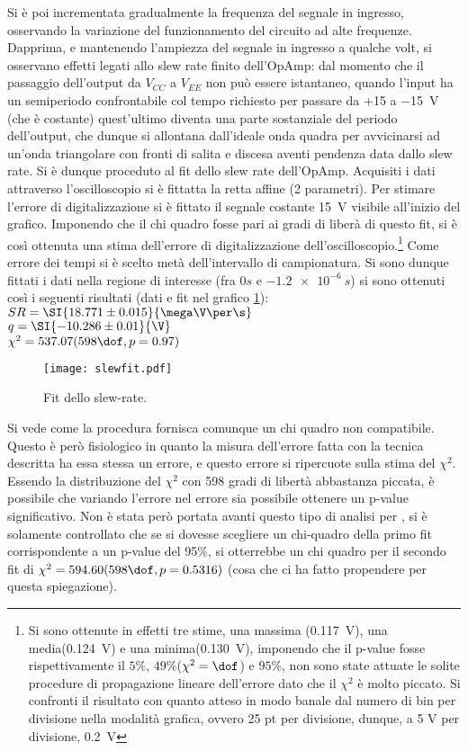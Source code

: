 Si è poi incrementata gradualmente la frequenza del segnale in ingresso, osservando la variazione del funzionamento del circuito ad alte frequenze.
Dapprima, e mantenendo l'ampiezza del segnale in ingresso a qualche volt, si osservano effetti legati allo slew rate finito dell'OpAmp: dal momento che il passaggio dell'output da $V_{CC}$ a $V_{EE}$ non può essere istantaneo, quando l'input ha un semiperiodo confrontabile col tempo richiesto per passare da +15 a \SI{-15}{\V} (che è costante) quest'ultimo diventa una parte sostanziale del periodo dell'output, che dunque si allontana dall'ideale onda quadra per avvicinarsi ad un'onda triangolare con fronti di salita e discesa aventi pendenza data dallo slew rate.
Si è dunque proceduto al fit dello slew rate dell'OpAmp. Acquisiti i dati attraverso l'oscilloscopio si è fittatta la retta affine (2 parametri). Per stimare l'errore di digitalizzazione si è fittato il segnale costante \SI{15}{\V} visibile all'inizio del grafico. Imponendo che il chi quadro fosse pari ai gradi di liberà di questo fit, si è così ottenuta una stima dell'errore di digitalizzazione dell'oscilloscopio.\footnote{Si sono ottenute in effetti tre stime, una massima (\SI{0.117}{V}), una media(\SI{0.124}{V}) e una minima(\SI{0.130}{V}), imponendo che il p-value fosse rispettivamente il $5\%$, $49\%$($\chi^2=\dof$) e $95\%$, non sono state attuate le solite procedure di propagazione lineare dell'errore dato che il $\chi^2$ è molto piccato. Si confronti il risultato con quanto atteso in modo banale dal numero di bin per divisione nella modalità grafica, ovvero 25 pt per divisione, dunque, a 5 V per divisione,  \SI{0.2}{V}} Come errore dei tempi si è scelto metà dell'intervallo di campionatura. Si sono dunque fittati i dati nella regione di interesse (fra $0 s$ e $\SI{-1.2e-6}{s}$) si sono ottenuti così i seguenti risultati	(dati e fit nel grafico \ref{f:SLW}):\\
$SR = \SI{18.771 \pm 0.015}{\mega\V\per\s}$\\
$q = \SI{-10.286 \pm 0.01}{\V}$\\
$\chi^2 = 537.07 (598 \dof, p = 0.97)$\\

\begin{figure}[h]
	\centering
	\texttt{[image: slewfit.pdf]}
	\caption{Fit dello slew-rate.}
	\label{f:SLW}
\end{figure}
Si vede come la procedura fornisca comunque un chi quadro non compatibile. Questo è però fisiologico in quanto la misura dell'errore fatta con la tecnica descritta ha essa stessa un errore, e questo errore si ripercuote sulla stima del $\chi^2$. Essendo la distribuzione del $\chi^2$ con 598 gradi di libertà abbastanza piccata, è possibile che variando l'errore nel errore sia possibile ottenere un p-value significativo. Non è stata però portata avanti questo tipo di analisi per \sbatta, si è solamente controllato che se si dovesse scegliere un chi-quadro della primo fit corrispondente a un p-value del 95\%, si otterrebbe un chi quadro per il secondo fit di $\chi^2 = 594.60 (598 \dof, p = 0.5316)$ (cosa che ci ha fatto propendere per questa spiegazione). 



